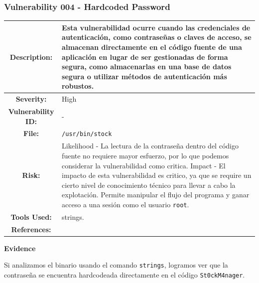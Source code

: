 \documentclass[a4paper]{article} %
\begin{document}
    \subsubsection{\textbf{Vulnerability 004 - Hardcoded Password}}
    \begin{table}[htbp]
        \begin{tabularx}{\textwidth}{|c|X|}
            \hline
            \cellcolor{lightgray}\textbf{Description:} & 
            {
                Esta vulnerabilidad ocurre cuando las credenciales de autenticación, como contraseñas o claves de acceso, se almacenan directamente en el código fuente de una aplicación en lugar de ser gestionadas de forma segura, como almacenarlas en una base de datos segura o utilizar métodos de autenticación más robustos.
            } \\
            \hline
            \cellcolor{lightgray}\textbf{Severity:} &
            {
                High
            } \\
            \hline
            \cellcolor{lightgray}\textbf{Vulnerability ID:} &
            {-} \\
            \hline
            \cellcolor{lightgray}\textbf{File:} &
            {
                \texttt{/usr/bin/stock}
            } \\
            \hline
            \cellcolor{lightgray}\textbf{Risk:} &
            {
                Likelihood - La lectura de la contraseña dentro del código fuente no requiere mayor esfuerzo, por lo que podemos considerar la vulnerabilidad como critica.
                \newline
                Impact - El impacto de esta vulnerabilidad es critico, ya que se require un cierto nivel de conocimiento técnico para llevar a cabo la explotación. Permite manipular el flujo del programa y ganar acceso a una sesión como el usuario \texttt{root}.
            } \\
            \hline
            \cellcolor{lightgray}\textbf{Tools Used:} &
            {
                strings.
            } \\
            \hline
            \cellcolor{lightgray}\textbf{References:} &        
            {} \\
            \hline
        \end{tabularx}
    \end{table}
    
    \textbf{Evidence}

    Si analizamos el binario usando el comando \texttt{strings}, logramos ver que la contraseña se encuentra hardcodeada directamente en el código \texttt{St0ckM4nager}.
\end{document}
